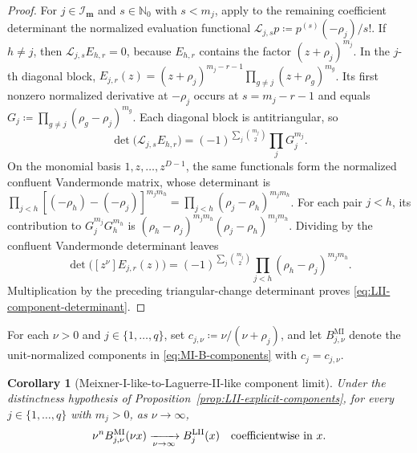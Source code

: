 \documentclass[10pt]{amsart}
\newcommand{\Nzero}{\mathbb N_0}
\newcommand{\mm}{\boldsymbol m}
\theoremstyle{plain}
\newtheorem{corollary}[theorem]{Corollary}
\theoremstyle{definition}
\theoremstyle{remark}
\begin{document}
\begin{proof}
For \(j\in\mathcal I_{\mm}\) and \(s\in\Nzero\) with \(s<m_j\),
apply to the remaining coefficient determinant the
normalized evaluation functional
\(\mathcal L_{j,s}p\coloneq p^{(s)}(-\rho_j)/s!\).
If \(h\ne j\), then \(\mathcal L_{j,s}E_{h,r}=0\), because
\(E_{h,r}\) contains the factor \((z+\rho_j)^{m_j}\).  In the \(j\)-th
diagonal block,
\(E_{j,r}(z)=(z+\rho_j)^{m_j-r-1}
\prod_{g\ne j}(z+\rho_g)^{m_g}\).
Its first nonzero normalized derivative at \(-\rho_j\) occurs at
\(s=m_j-r-1\) and equals
\(G_j\coloneq\prod_{g\ne j}(\rho_g-\rho_j)^{m_g}\).
Each diagonal block is antitriangular, so
\[
 \det\bigl(\mathcal L_{j,s}E_{h,r}\bigr)
 =(-1)^{\sum_j\binom{m_j}{2}}\prod_jG_j^{m_j}.
\]
On the monomial basis \(1,z,\ldots,z^{D-1}\), the same functionals form
the normalized confluent Vandermonde matrix, whose determinant is
\(\prod_{j<h}[(-\rho_h)-(-\rho_j)]^{m_jm_h}
=\prod_{j<h}(\rho_j-\rho_h)^{m_jm_h}\).
For each pair \(j<h\), its contribution to \(G_j^{m_j}G_h^{m_h}\) is
\((\rho_h-\rho_j)^{m_jm_h}(\rho_j-\rho_h)^{m_jm_h}\).
Dividing by the confluent Vandermonde determinant leaves
\[
 \det\bigl([z^\nu]E_{j,r}(z)\bigr)
 =(-1)^{\sum_j\binom{m_j}{2}}
 \prod_{j<h}(\rho_h-\rho_j)^{m_jm_h}.
\]
Multiplication by the preceding triangular-change determinant proves
\eqref{eq:LII-component-determinant}.
\end{proof}

For each \(\nu>0\) and \(j\in\{1,\ldots,q\}\), set
\(c_{j,\nu}\coloneq\nu/(\nu+\rho_j)\), and let
\(B_{j,\nu}^{\mathrm{MI}}\) denote the unit-normalized components in
\eqref{eq:MI-B-components} with \(c_j=c_{j,\nu}\).

\begin{corollary}[Meixner-I-like-to-Laguerre-II-like component limit]
\label{cor:MI-LII-component-limit}
Under the distinctness hypothesis of
Proposition~\ref{prop:LII-explicit-components}, for every
\(j\in\{1,\ldots,q\}\) with \(m_j>0\), as \(\nu\to\infty\),
\begin{equation}
 \nu^n B_{j,\nu}^{\mathrm{MI}}(\nu x)
 \xrightarrow[\nu\to\infty]{}B_j^{\mathrm{LII}}(x)
 \quad\hbox{coefficientwise in }x .
 \label{eq:MI-LII-component-limit}
\end{equation}
\end{corollary}
\end{document}
